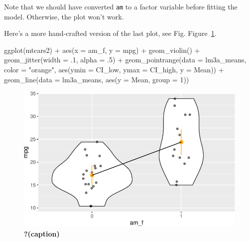 \documentclass[
  letterpaper,
  DIV=11,
  numbers=noendperiod]{scrreprt}
\newenvironment{Shaded}{\begin{snugshade}}{\end{snugshade}}
\newcommand{\AttributeTok}[1]{\textcolor[rgb]{0.40,0.45,0.13}{#1}}
\newcommand{\DecValTok}[1]{\textcolor[rgb]{0.68,0.00,0.00}{#1}}
\newcommand{\FunctionTok}[1]{\textcolor[rgb]{0.28,0.35,0.67}{#1}}
\newcommand{\NormalTok}[1]{\textcolor[rgb]{0.00,0.23,0.31}{#1}}
\newcommand{\SpecialCharTok}[1]{\textcolor[rgb]{0.37,0.37,0.37}{#1}}
\newcommand{\StringTok}[1]{\textcolor[rgb]{0.13,0.47,0.30}{#1}}
\theoremstyle{definition}
\theoremstyle{definition}
\theoremstyle{remark}
\begin{document}
Note that we should have converted \texttt{am} to a factor variable
before fitting the model. Otherwise, the plot won't work.

Here's a more hand-crafted version of the last plot, see Fig.
Figure~\ref{fig-lm3a-means}.

\begin{Shaded}
\begin{Highlighting}[]
\FunctionTok{ggplot}\NormalTok{(mtcars2) }\SpecialCharTok{+}
  \FunctionTok{aes}\NormalTok{(}\AttributeTok{x =}\NormalTok{ am\_f, }\AttributeTok{y =}\NormalTok{ mpg) }\SpecialCharTok{+}
  \FunctionTok{geom\_violin}\NormalTok{() }\SpecialCharTok{+}
  \FunctionTok{geom\_jitter}\NormalTok{(}\AttributeTok{width =}\NormalTok{ .}\DecValTok{1}\NormalTok{, }\AttributeTok{alpha =}\NormalTok{ .}\DecValTok{5}\NormalTok{) }\SpecialCharTok{+}
  \FunctionTok{geom\_pointrange}\NormalTok{(}\AttributeTok{data =}\NormalTok{ lm3a\_means,}
                  \AttributeTok{color =} \StringTok{"orange"}\NormalTok{,}
                  \FunctionTok{aes}\NormalTok{(}\AttributeTok{ymin =}\NormalTok{ CI\_low, }\AttributeTok{ymax =}\NormalTok{ CI\_high, }\AttributeTok{y =}\NormalTok{ Mean)) }\SpecialCharTok{+}
  \FunctionTok{geom\_line}\NormalTok{(}\AttributeTok{data =}\NormalTok{ lm3a\_means, }\FunctionTok{aes}\NormalTok{(}\AttributeTok{y =}\NormalTok{ Mean, }\AttributeTok{group =} \DecValTok{1}\NormalTok{))}
\end{Highlighting}
\end{Shaded}

\begin{figure}[H]

{\centering \includegraphics{./regression1_files/figure-pdf/fig-lm3a-means-1.pdf}

}

\caption{\label{fig-lm3a-means}\textbf{?(caption)}}

\end{figure}
\end{document}
